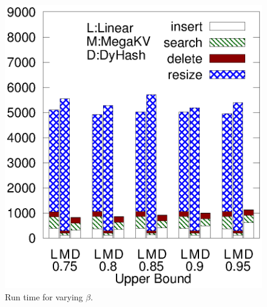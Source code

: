 \begin{figure}[htp]
\begin{minipage}{0.19\linewidth}
		\centerline{\dsali}
	\end{minipage}
	\begin{minipage}{0.19\linewidth}\centering
		\includegraphics[width=\linewidth]{pic/dynamic/random/diff_upper.eps}
		\centerline{\dsrandom}
	\end{minipage}
	\caption{Run time for varying $\beta$.}
	\label{fig:vary-beta}
\end{figure}
%
